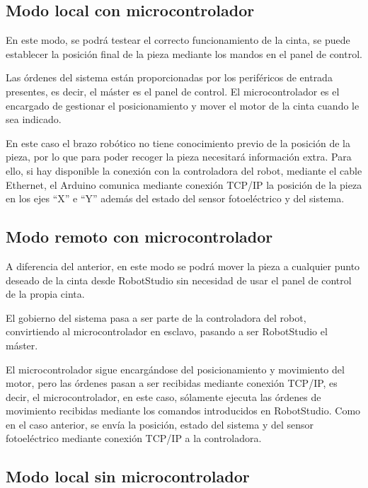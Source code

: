 \subsection{Modo local con microcontrolador}\label{subsec-01}

En este modo, se podrá testear el correcto funcionamiento de la cinta, se puede establecer la posición final de la pieza mediante los mandos en el panel de control.

Las órdenes del sistema están proporcionadas por los periféricos de entrada presentes, es decir, el máster es el panel de control. El microcontrolador es el encargado de gestionar el posicionamiento y mover el motor de la cinta cuando le sea indicado. 

En este caso el brazo robótico no tiene conocimiento previo de la posición de la pieza, por lo que para poder recoger la pieza necesitará información extra. Para ello, si hay disponible la conexión con la controladora del robot, mediante el cable Ethernet, el Arduino comunica mediante conexión TCP/IP la posición de la pieza en los ejes “X” e “Y” además del estado del sensor fotoeléctrico y del sistema.

\subsection{Modo remoto con microcontrolador}\label{subsec-02}

A diferencia del anterior, en este modo se podrá mover la pieza a cualquier punto deseado de la cinta desde RobotStudio sin necesidad de usar el panel de control de la propia cinta.

El gobierno del sistema pasa a ser parte de la controladora del robot, convirtiendo al microcontrolador en esclavo, pasando a ser RobotStudio el máster.

El microcontrolador sigue encargándose del posicionamiento y movimiento del motor, pero las órdenes pasan a ser recibidas mediante conexión TCP/IP, es decir, el microcontrolador, en este caso, sólamente ejecuta las órdenes de movimiento recibidas mediante los comandos introducidos en RobotStudio. Como en el caso anterior, se envía la posición, estado del sistema y del sensor fotoeléctrico mediante conexión TCP/IP a la controladora.

\subsection{Modo local sin microcontrolador}\label{subsec-03}

